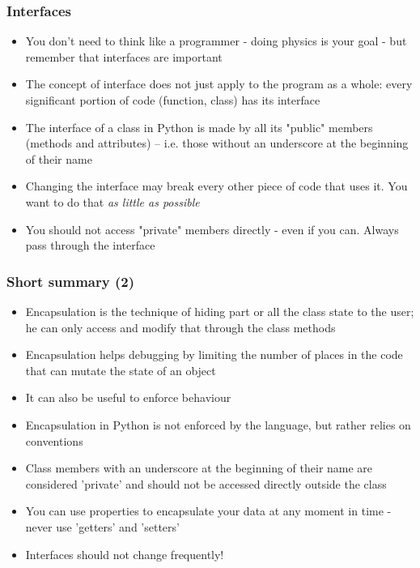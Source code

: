 \documentclass[9pt]{beamer}
\begin{document}
\begin{frame}
  \frametitle{Interfaces}

  \begin{itemize}
    \item You don't need to think like a programmer - doing physics is your goal - but
          remember that \alert{interfaces are important}
    \medskip
    \item The concept of interface does not just apply to the program as a whole:
          every significant portion of code (function, class) has its interface
    \medskip
    \item The interface of a class in Python is made by all its "public" members (methods and attributes)
          -- i.e. those without an underscore at the beginning of their name
    \medskip
    \item Changing the interface may break every other piece of code that uses it.
          You want to do that \emph{as little as possible}
    \medskip
    \item You should not access "private" members directly - even if you can. Always
          pass through the interface

  \end{itemize}

\end{frame}


\begin{frame}
  \frametitle{Short summary (2)}

  \begin{itemize}
    \small
    \item Encapsulation is the technique of hiding part or all the class state to the user;
          he can only access and modify that through the class methods
    \medskip
    \item Encapsulation helps debugging by limiting the number of places in the code
          that can mutate the state of an object
    \medskip
    \item It can also be useful to enforce behaviour
    \medskip
    \item Encapsulation in Python is not enforced by the language, but rather relies on conventions
    \medskip
    \item Class members with an underscore at the beginning of their name are
          considered 'private' and should not be accessed directly outside the class
    \smallskip
    \item You can use properties to encapsulate your data at any moment in time - never use 'getters' and 'setters'
    \medskip
    \item Interfaces should not change frequently!
  \end{itemize}

\end{frame}
\end{document}
